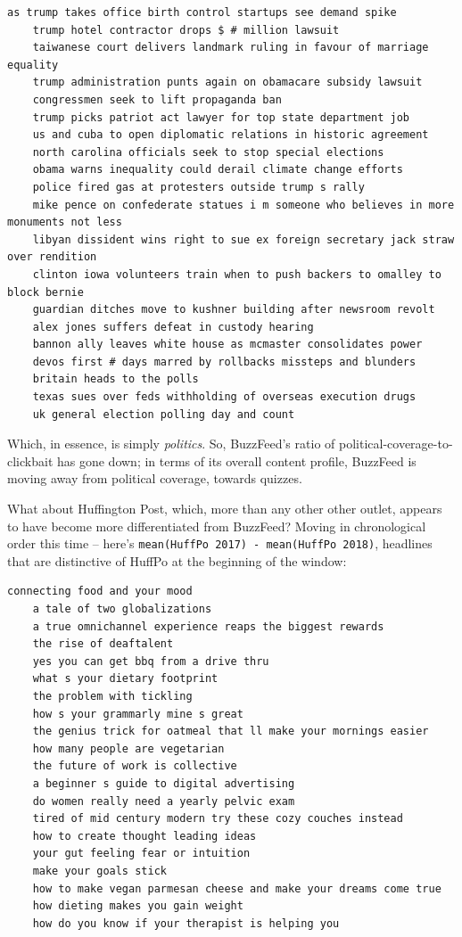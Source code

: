 \documentclass{scrartcl}
\begin{document}
\begin{lstlisting}[basicstyle=\tiny\hlfont]
    as trump takes office birth control startups see demand spike
    trump hotel contractor drops $ # million lawsuit
    taiwanese court delivers landmark ruling in favour of marriage equality
    trump administration punts again on obamacare subsidy lawsuit
    congressmen seek to lift propaganda ban
    trump picks patriot act lawyer for top state department job
    us and cuba to open diplomatic relations in historic agreement
    north carolina officials seek to stop special elections
    obama warns inequality could derail climate change efforts
    police fired gas at protesters outside trump s rally
    mike pence on confederate statues i m someone who believes in more monuments not less
    libyan dissident wins right to sue ex foreign secretary jack straw over rendition
    clinton iowa volunteers train when to push backers to omalley to block bernie
    guardian ditches move to kushner building after newsroom revolt
    alex jones suffers defeat in custody hearing
    bannon ally leaves white house as mcmaster consolidates power
    devos first # days marred by rollbacks missteps and blunders
    britain heads to the polls
    texas sues over feds withholding of overseas execution drugs
    uk general election polling day and count
\end{lstlisting}

Which, in essence, is simply \textit{politics}. So, BuzzFeed's ratio of political-coverage-to-clickbait has gone down; in terms of its overall content profile, BuzzFeed is moving away from political coverage, towards quizzes.

What about Huffington Post, which, more than any other other outlet, appears to have become more differentiated from BuzzFeed? Moving in chronological order this time -- here's \texttt{mean(HuffPo 2017) - mean(HuffPo 2018)}, headlines that are distinctive of HuffPo at the beginning of the window:

\begin{lstlisting}[basicstyle=\tiny\hlfont]
    connecting food and your mood
    a tale of two globalizations
    a true omnichannel experience reaps the biggest rewards
    the rise of deaftalent
    yes you can get bbq from a drive thru
    what s your dietary footprint
    the problem with tickling
    how s your grammarly mine s great
    the genius trick for oatmeal that ll make your mornings easier
    how many people are vegetarian
    the future of work is collective
    a beginner s guide to digital advertising
    do women really need a yearly pelvic exam
    tired of mid century modern try these cozy couches instead
    how to create thought leading ideas
    your gut feeling fear or intuition
    make your goals stick
    how to make vegan parmesan cheese and make your dreams come true
    how dieting makes you gain weight
    how do you know if your therapist is helping you
\end{lstlisting}
\end{document}
